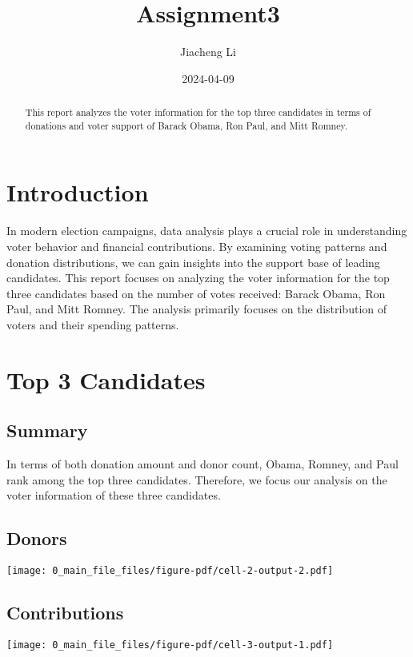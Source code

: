 \documentclass[
  letterpaper,
  DIV=11,
  numbers=noendperiod]{scrartcl}
\title{Assignment3}
\author{Jiacheng Li}
\date{2024-04-09}
\begin{document}
\maketitle
\begin{abstract}
This report analyzes the voter information for the top three candidates
in terms of donations and voter support of Barack Obama, Ron Paul, and
Mitt Romney.
\end{abstract}


\section{Introduction}\label{introduction}

In modern election campaigns, data analysis plays a crucial role in
understanding voter behavior and financial contributions. By examining
voting patterns and donation distributions, we can gain insights into
the support base of leading candidates. This report focuses on analyzing
the voter information for the top three candidates based on the number
of votes received: Barack Obama, Ron Paul, and Mitt Romney. The analysis
primarily focuses on the distribution of voters and their spending
patterns.

\section{Top 3 Candidates}\label{top-3-candidates}

\subsection{Summary}\label{summary}

In terms of both donation amount and donor count, Obama, Romney, and
Paul rank among the top three candidates. Therefore, we focus our
analysis on the voter information of these three candidates.

\subsection{Donors}\label{donors}

\texttt{[image: 0\_main\_file\_files/figure-pdf/cell-2-output-2.pdf]}

\subsection{Contributions}\label{contributions}

\texttt{[image: 0\_main\_file\_files/figure-pdf/cell-3-output-1.pdf]}
\end{document}
